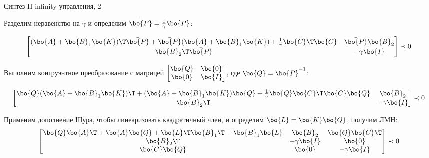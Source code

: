 \documentclass{beamer}
\begin{document}
	
	\begin{frame}{Синтез H-infinity управления, 2}
		\begin{flushleft}
			
			Разделим неравенство на $\gamma$ и определим $\bar{\bo{P}} = \frac{1}{\gamma} \bo{P}$:
			
			\begin{align}
				\begin{bmatrix}
					(\bo{A}+\bo{B}_1\bo{K})\T\bar{\bo{P}}+\bar{\bo{P}}(\bo{A}+\bo{B}_1\bo{K})+\frac{1}{\gamma}\bo{C}\T\bo{C} & \bar{\bo{P}}\bo{B}_2 \\
					\bo{B}_2\T\bar{\bo{P}}  & -\gamma \bo{I}
				\end{bmatrix}
				\prec 0
			\end{align}
			
			Выполним конгруэнтное преобразование с матрицей $\begin{bmatrix}
				\bo{Q} &\bo{0} \\
				\bo{0}  &  \bo{I}
			\end{bmatrix}$, где $\bo{Q} = \bar{\bo{P}}^{-1}$:
			
			\begin{align}
				\begin{bmatrix}
					\bo{Q}(\bo{A}+\bo{B}_1\bo{K})\T+(\bo{A}+\bo{B}_1\bo{K})\bo{Q}+\frac{1}{\gamma}\bo{Q}\bo{C}\T\bo{C}\bo{Q} & \bo{B}_2 \\
					\bo{B}_2\T  & -\gamma \bo{I}
				\end{bmatrix}
				\prec 0
			\end{align}
			
			Применим дополнение Шура, чтобы линеаризовать квадратичный член, и определим $\bo{L} = \bo{K}\bo{Q}$, получим ЛМН:
			\begin{align}
				\begin{bmatrix}
					\bo{Q}\bo{A}\T + \bo{A}\bo{Q} + \bo{L}\T \bo{B}_1\T +\bo{B}_1 \bo{L} & \bo{B}_2 & \bo{Q}\bo{C}\T \\
					\bo{B}_2\T  & -\gamma \bo{I} & \bo{0} \\
					\bo{C}\bo{Q} & \bo{0} & -\gamma \bo{I}
				\end{bmatrix}
				\prec 0
			\end{align}
			
			
		\end{flushleft}
	\end{frame}
	
\end{document}
